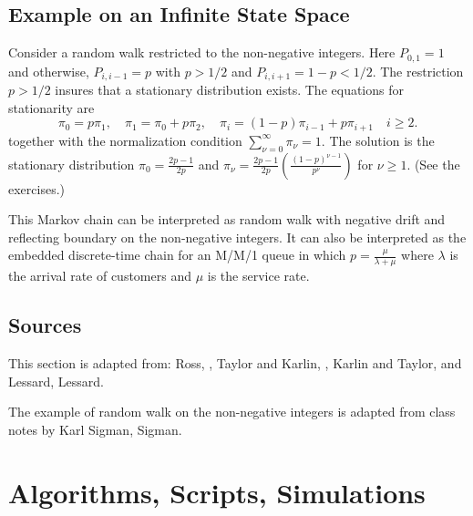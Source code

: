 \documentclass[12pt]{article}
\begin{document}
\subsection*{Example on an Infinite State Space}

Consider a random walk restricted to the non-negative integers.  Here \(
P_{0,1} = 1 \) and otherwise, \( P_{i,i-1} = p \) with \( p > 1/2 \) and
\( P_{i,i+1} = 1- p < 1/2 \).  The restriction \( p > 1/2 \) insures
that a stationary distribution exists.  The equations for stationarity
are
\[
    \pi_0 = p \pi_1, \quad \pi_1 = \pi_0 + p \pi_2, \quad \pi_i = (1-p)
    \pi_{i-1} + p \pi_{i+1} \quad i \ge 2.
\] together with the normalization condition \( \sum_{\nu=0}^{\infty}
\pi_{\nu} = 1 \). The solution is the stationary distribution \( \pi_0 =
\frac{2p-1}{2p} \) and \( \pi_{\nu} = \frac{2p-1}{2p} \left( \frac{(1-p)^
{\nu - 1}}{p^{\nu}} \right) \) for \( \nu \ge 1 \).  (See the exercises.)

This Markov chain can be interpreted as random walk with negative drift
and reflecting boundary on the non-negative integers.  It can also be
interpreted as the embedded discrete-time chain for an M/M/1 queue in
which \( p = \frac{\mu}{\lambda + \mu} \) where \( \lambda \) is the
arrival rate of customers and \( \mu \) is the service rate.

\subsection*{Sources}

This section is adapted from:  Ross, , Taylor and Karlin, , Karlin and Taylor,  and Lessard, 
{Lessard}.

The example of random walk on the non-negative integers is adapted from
class notes by Karl Sigman, 
{Sigman}.

\nocite{ross97}
\nocite{taylor98-introd-stoch-model}
\nocite{karlin81-secon-cours-stoch-proces}

\hr

\section*{Algorithms, Scripts, Simulations}
\end{document}
